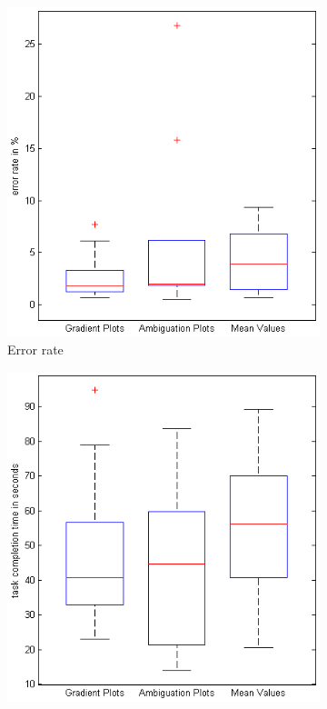 \begin{figure}[H]
    \centering
    \begin{subfigure}[b]{0.32\textwidth}
        \includegraphics[width=\textwidth]{figures/boxplots/s1_error.png}
        \caption{Error rate}
        \label{fig:s1_error}
    \end{subfigure}
    \begin{subfigure}[b]{0.32\textwidth}
        \includegraphics[width=\textwidth]{figures/boxplots/s1_time.png}

\end{subfigure}
\end{figure}
